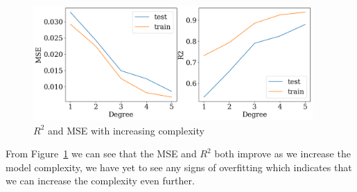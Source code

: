 \documentclass[twoside,11pt]{report}
\begin{document}
\begin{figure}[!h]
    \begin{center}
        \includegraphics[width=0.95\textwidth]{../runsAndAdditions/R2andMSEOLS.png}
    \end{center}
    \caption{$R^2$ and MSE with increasing complexity}\label{fig:R2andMSEOLS}
\end{figure}

From Figure~\ref{fig:R2andMSEOLS} we can see that the MSE and $R^2$ both improve as we increase the model complexity, we have yet to see any signs of overfitting which indicates that we can increase the complexity even further.\\
\end{document}
